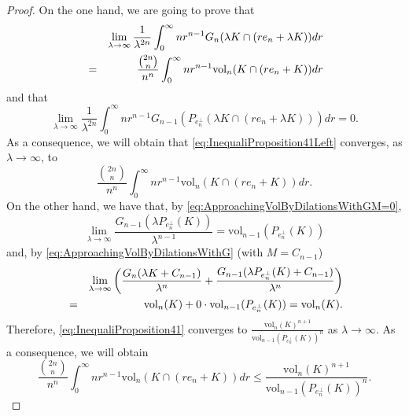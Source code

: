 \documentclass[10pt,a4paper]{amsart}
\def\vol{\mathrm{vol}}
\begin{document}
\begin{proof}
On the one hand, we are going to prove that
\begin{eqnarray}\label{eq:Claim1}
&&\lim_{\lambda\to\infty}\frac{1}{\lambda^{2n}}\int_0^\infty nr^{n-1}G_n(\lambda K\cap(re_n+\lambda K))dr\cr
&=&\frac{{{2n}\choose{n}}}{n^n}\int_0^\infty nr^{n-1}\vol_n( K\cap(re_n+ K))dr
\end{eqnarray}
and that
\begin{equation}\label{eq:Claim2}
\lim_{\lambda\to\infty}\frac{1}{\lambda^{2n}}\int_0^\infty nr^{n-1}G_{n-1}(P_{e_n^\perp}(\lambda K\cap(re_n+\lambda K)))dr=0.
\end{equation}
As a consequence, we will obtain that \eqref{eq:InequaliProposition41Left} converges, as $\lambda\to\infty$, to
$$
\frac{{{2n}\choose{n}}}{n^n}\int_0^\infty nr^{n-1}\vol_n( K\cap(re_n+ K))dr.
$$
On the other hand, we have that, by \eqref{eq:ApproachingVolByDilationsWithGM=0},
$$
\lim_{\lambda\to\infty}\frac{G_{n-1}(\lambda P_{e_n^\perp}(K))}{\lambda^{n-1}}=\vol_{n-1}(P_{e_n^\perp}(K))
$$
and, by \eqref{eq:ApproachingVolByDilationsWithG} (with $M=C_{n-1}$)
\begin{eqnarray*}
&&\lim_{\lambda\to\infty}\left(\frac{G_n(\lambda K+C_{n-1})}{\lambda^n}+\frac{G_{n-1}(\lambda P_{e_n^\perp}(K)+C_{n-1})}{\lambda^n}\right)\cr
&=&\vol_n(K)+0\cdot\vol_{n-1}(P_{e_n^\perp}(K))=\vol_n(K).
\end{eqnarray*}
Therefore, \eqref{eq:InequaliProposition41} converges to $\frac{\vol_n(K)^{n+1}}{\vol_{n-1}(P_{e_n^\perp}(K))^n}$ as $\lambda\to\infty$. As a consequence, we will obtain
$$
\frac{{{2n}\choose{n}}}{n^n}\int_0^\infty nr^{n-1}\vol_n( K\cap(re_n+ K))dr\leq\frac{\vol_n(K)^{n+1}}{\vol_{n-1}(P_{e_n^\perp}(K))^n}.
$$


\end{proof}
\end{document}
